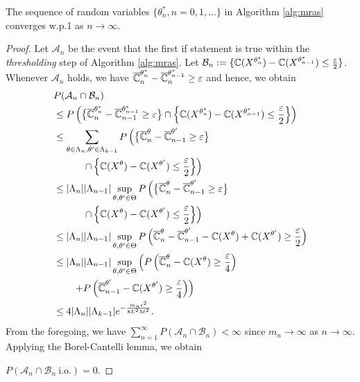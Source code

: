 \begin{lemma}\label{lemma:iofo}
    The sequence of random variables $\{\theta^*_n,n=0,1,\ldots \}$ in Algorithm \ref{alg:mras} converges w.p.1 as $n\rightarrow \infty$.
\end{lemma}
\begin{proof}
    Let $\mathcal{A}_n$ be the event that the first if statement is true within the \textit{thresholding} step of Algorithm \ref{alg:mras}. Let $\mathcal{B}_n:=\{\mathbb{C}(X^{\theta^*_{n}})-\mathbb{C}(X^{\theta^*_{n-1}})\leq \frac{\varepsilon}{2}\}$.
    Whenever $\mathcal{A}_n$ holds, we have $\overline {\mathbb{C}}_n^{\theta^*_{n}}-\overline {\mathbb{C}}_n^{\theta^*_{n-1}}\geq \varepsilon$ and hence, we obtain
\begin{align*}
&P(\mathcal{A}_{n}\cap \mathcal{B}_n) \\
&\leq P 
\left(\big\{\overline {\mathbb{C}}_n^{\theta^*_{n}}-\overline {\mathbb{C}}_{n-1}^{\theta^*_{n-1}}\geq \varepsilon\big\}\cap \left\{\mathbb{C}(X^{\theta^*_{n}})-\mathbb{C}(X^{\theta^*_{n-1}})\leq \frac{\varepsilon}{2}\right\}\right)\\
&\leq  \sum_{{\theta\in \Lambda_n},{\theta'\in \Lambda_{k-1}}}P\left(\big\{\overline {\mathbb{C}}_n^{\theta}-\overline {\mathbb{C}}_{n-1}^{\theta'}\geq \varepsilon\big\} \right.\\
&\qquad\quad \left.\cap
\left\{\mathbb{C}(X^{\theta})-\mathbb{C}(X^{\theta'})\leq \frac{\varepsilon}{2}\right\}\right) \\
&\leq  |\Lambda_n||\Lambda_{n-1}|\sup_{\theta,\theta'\in \Theta}P\left(\big\{\overline {\mathbb{C}}_n^{\theta}-\overline {\mathbb{C}}_{n-1}^{\theta'}\geq \varepsilon\big\} \right.\\
&\quad\qquad \left.\cap \left\{\mathbb{C}(X^{\theta})-\mathbb{C}(X^{\theta'})\leq \frac{\varepsilon}{2}\right\} \right) \\
&\leq |\Lambda_n||\Lambda_{n-1}|\sup_{\theta,\theta'\in \Theta}P\left(\overline {\mathbb{C}}_n^{\theta}-\overline {\mathbb{C}}_{n-1}^{\theta'}-\mathbb{C}(X^{\theta})+\mathbb{C}(X^{\theta'})\geq \frac{\varepsilon}{2}\right) \\
&\leq |\Lambda_n||\Lambda_{n-1}|\sup_{\theta,\theta'\in \Theta}\left(P\left(\overline {\mathbb{C}}_n^{\theta}-\mathbb{C}(X^{\theta})\geq \frac{\varepsilon}{4}\right)\right. \\
&\qquad\left. + P\left(\overline {\mathbb{C}}_{n-1}^{\theta'}-\mathbb{C}(X^{\theta'})\geq \frac{\varepsilon}{4}\right)\right) \\
&\leq  4|\Lambda_n||\Lambda_{k-1}|
 e^{- \frac{m_n\epsilon^2}{8 L^2 M^2}}.
\end{align*}
From the foregoing, we have $\sum_{n=1}^{\infty}P\left(\mathcal{A}_n \cap \mathcal{B}_n\right) < \infty$ since $m_n \rightarrow \infty$ as $n\rightarrow \infty$.  Applying the Borel-Cantelli lemma, we obtain\\
\centerline{$
P\left(\mathcal{A}_n \cap \mathcal{B}_n~\mbox{i.o.} \right)=0.
$}


\end{proof}
